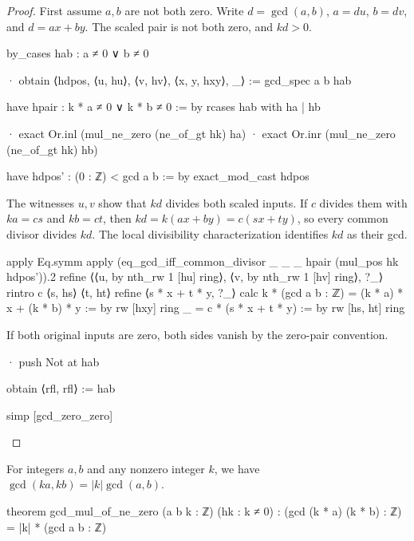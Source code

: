 \begin{proof}

  First assume $a,b$ are not both zero.
  Write $d=\gcd(a,b)$, $a=du$, $b=dv$, and $d=ax+by$.
  The scaled pair is not both zero, and $kd>0$.

  \begin{lean}
    by_cases hab : a ≠ 0 ∨ b ≠ 0

    · obtain ⟨hdpos, ⟨u, hu⟩, ⟨v, hv⟩, ⟨x, y, hxy⟩, _⟩ := gcd_spec a b hab

      have hpair : k * a ≠ 0 ∨ k * b ≠ 0 := by
        rcases hab with ha | hb

        · exact Or.inl (mul_ne_zero (ne_of_gt hk) ha)
        · exact Or.inr (mul_ne_zero (ne_of_gt hk) hb)

      have hdpos' : (0 : ℤ) < gcd a b := by
        exact_mod_cast hdpos
  \end{lean}

  The witnesses $u,v$ show that $kd$ divides both scaled inputs.
  If $c$ divides them with $ka=cs$ and $kb=ct$, then $kd=k(ax+by)=c(sx+ty)$, so every common
  divisor divides $kd$.
  The local divisibility characterization identifies $kd$ as their gcd.

  \begin{lean}
    apply Eq.symm
    apply (eq_gcd_iff_common_divisor _ _ _ hpair (mul_pos hk hdpos')).2
    refine ⟨⟨u, by
      nth_rw 1 [hu]
      ring⟩, ⟨v, by
        nth_rw 1 [hv]
        ring⟩, ?_⟩
    rintro c ⟨s, hs⟩ ⟨t, ht⟩
    refine ⟨s * x + t * y, ?_⟩
    calc
      k * (gcd a b : ℤ) = (k * a) * x + (k * b) * y := by
        rw [hxy]
        ring
      _ = c * (s * x + t * y) := by
        rw [hs, ht]
        ring
  \end{lean}

  If both original inputs are zero, both sides vanish by the zero-pair convention.

  \begin{lean}
    · push Not at hab

      obtain ⟨rfl, rfl⟩ := hab

      simp [gcd_zero_zero]
  \end{lean}

\end{proof}

\begin{corollary}
  \label{ent:thm:gcd-nonzero-factor}
  For integers $a,b$ and any nonzero integer $k$, we have $\gcd(ka,kb)=|k|\gcd(a,b)$.

  \begin{lean}
    theorem gcd_mul_of_ne_zero (a b k : ℤ) (hk : k ≠ 0) :
        (gcd (k * a) (k * b) : ℤ) = |k| * (gcd a b : ℤ)
  \end{lean}
\end{corollary}

